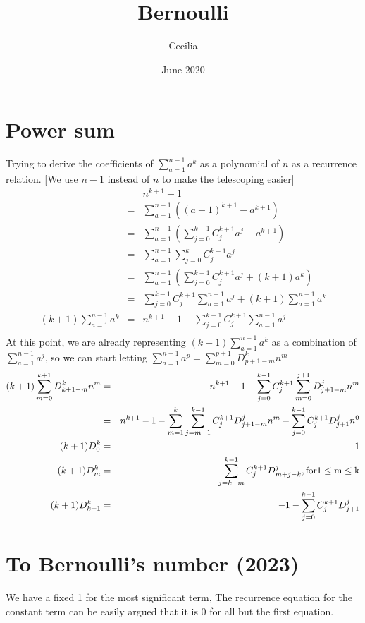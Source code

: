 \documentclass{article}
\title{Bernoulli}
\author{Cecilia}
\date{June 2020}
\begin{document}
\maketitle
\section{Power sum}
Trying to derive the coefficients of $ \sum\limits_{a=1}^{n-1} a^k $ as a polynomial of $ n $ as a recurrence relation. [We use $ n - 1 $ instead of $ n $ to make the telescoping easier]
\begin{eqnarray*}
& & n^{k+1} - 1 \\
  &=& \sum\limits_{a=1}^{n-1} \left((a + 1)^{k+1} - a^{k+1}\right) \\
  &=& \sum\limits_{a=1}^{n-1} \left(\sum\limits_{j=0}^{k+1}C_j^{k+1}a^j - a^{k+1}\right) \\
  &=& \sum\limits_{a=1}^{n-1} \sum\limits_{j=0}^{k}C_j^{k+1}a^j \\
  &=& \sum\limits_{a=1}^{n-1} \left(\sum\limits_{j=0}^{k-1}C_j^{k+1}a^j + (k+1)a^k \right) \\
  &=& \sum\limits_{j=0}^{k-1}C_j^{k+1}\sum\limits_{a=1}^{n-1} a^j + (k+1)\sum\limits_{a=1}^{n-1} a^k \\  
  (k+1)\sum\limits_{a=1}^{n-1} a^k &=& n^{k+1} - 1 - \sum\limits_{j=0}^{k-1}C_j^{k+1}\sum\limits_{a=1}^{n-1} a^j \\
\end{eqnarray*}
At this point, we are already representing $ (k+1)\sum\limits_{a=1}^{n-1} a^k $ as a combination of $ \sum\limits_{a=1}^{n-1} a^j $, so we can start letting $ \sum\limits_{a=1}^{n-1} a^p = \sum\limits_{m=0}^{p+1}D_{p+1-m}^kn^m $
\begin{eqnarray*}
  (k+1)\sum\limits_{m=0}^{k+1}D_{k+1-m}^kn^m &=& n^{k+1} - 1 - \sum\limits_{j=0}^{k-1}C_j^{k+1}\sum\limits_{m=0}^{j+1}D_{j+1-m}^jn^m \\
  &=& n^{k+1} - 1 - \sum\limits_{m=1}^{k}\sum\limits_{j=m-1}^{k-1}C_j^{k+1}D_{j+1-m}^jn^m - \sum\limits_{j=0}^{k-1}C_j^{k+1}D_{j+1}^jn^0 \\
  (k+1)D_0^k &=& 1 \\
  (k+1)D_m^k &=& -\sum\limits_{j=k-m}^{k-1}C_j^{k+1}D_{m+j-k}^j  \rm {, for } 1 \le m \le k \\
  (k+1)D_{k+1}^k &=& -1 -\sum\limits_{j=0}^{k-1}C_j^{k+1}D_{j+1}^j
\end{eqnarray*}

\section{To Bernoulli's number (2023)}
We have a fixed 1 for the most significant term, The recurrence equation for the constant term can be easily argued that it is 0 for all but the first equation.
\end{document}
